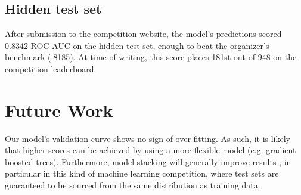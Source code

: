 \documentclass{article}[12pt]
\begin{document}
\subsection{Hidden test set}

After submission to the competition website, the model's predictions scored 0.8342 ROC AUC 
on the hidden test set, enough to beat the organizer's benchmark (.8185). 
At time of writing, this score places 181st out of 948 on the competition leaderboard. 

\section{Future Work}

Our  model's validation curve shows no sign of over-fitting. As such, it is likely that
higher scores can be achieved by using a more flexible model (e.g. gradient boosted trees).
Furthermore, model stacking will generally improve results \cite{elements}, in particular
in this kind of machine learning competition, where test sets are guaranteed to be sourced
from the same distribution as training data.



\end{document}
